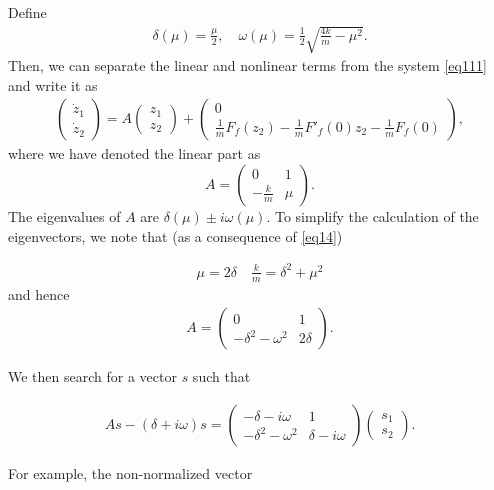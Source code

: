 \begin{solution}[4.4]
\begin{enumerate}
Define 
\begin{align}
\label{eq14}
\boxed{\delta(\mu)=\frac{\mu}{2}, \quad \omega(\mu)=\frac{1}{2}\sqrt{\frac{4k}{m}-\mu^2}.}
\end{align}
Then, we can separate the linear and nonlinear terms from the system \eqref{eq111} and write it as
\begin{align}
\label{transf}
\begin{pmatrix} \dot{z}_1 \\ \dot{z}_2 \end{pmatrix} = A\begin{pmatrix} z_1 \\ z_2 \end{pmatrix} + \begin{pmatrix} 0 \\ \frac{1}{m}F_f(z_2)-\frac{1}{m}F'_f(0)z_2 - \frac{1}{m}F_f(0)\end{pmatrix},
\end{align}
where we have denoted the linear part as $$A=\begin{pmatrix} 0 & 1 \\ -\frac{k}{m} & \mu \end{pmatrix}.$$ The eigenvalues of $A$ are $\delta(\mu)\pm i \omega(\mu)$. To simplify the calculation of the eigenvectors, we note that  (as a consequence of \eqref{eq14})

\begin{align}
\mu = 2\delta \quad \frac{k}{m} = \delta^2 + \mu^2
\end{align}
and hence
\begin{align}
A=\begin{pmatrix}0 & 1 \\ -\delta^2 -\omega^2 & 2\delta  \end{pmatrix}.
\end{align}

We then search for a vector $s$ such that 

\begin{align}
As-(\delta + i\omega)s =\begin{pmatrix}-\delta - i\omega & 1 \\ -\delta^2 -\omega^2 & \delta-i\omega  \end{pmatrix}   \begin{pmatrix} s_1 \\ s_2\end{pmatrix}.
\end{align}

For example, the non-normalized vector


\end{enumerate}
\end{solution}
